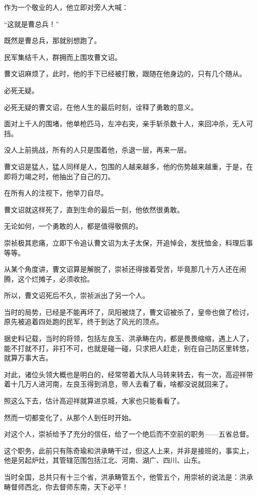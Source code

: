 \begin{multicols}{\theparacolNo}
		作为一个敬业的人，他立即对旁人大喊：

		“这就是曹总兵！”

		既然是曹总兵，那就别想跑了。

		民军集结千人，群拥而上围攻曹文诏。

		曹文诏麻烦了，此时，他的手下已经被打散，跟随在他身边的，只有几个随从。

		必死无疑。

		必死无疑的曹文诏，在他人生的最后时刻，诠释了勇敢的意义。

		面对上千人的围堵，他单枪匹马，左冲右突，亲手斩杀数十人，来回冲杀，无人可挡。

		没人上前挑战，所有的人只是围着他，杀退一层，再来一层。

		曹文诏是猛人，猛人同样是人，包围的人越来越多，他的伤势越来越重，于是，在即将力竭之时，他抽出了自己的刀。

		在所有人的注视下，他举刀自尽。

		曹文诏就这样死了，直到生命的最后一刻，他依然很勇敢。

		无论如何，一个勇敢的人，都是值得敬佩的。

		崇祯极其悲痛，立即下令追认曹文诏为太子太保，开追悼会，发抚恤金，料理后事等等。

		从某个角度讲，曹文诏算是解脱了，崇祯还得接着受苦，毕竟那几十万人还在闹腾，这个烂摊子，必须收拾。

		所以，曹文诏死后不久，崇祯派出了另一个人。

		当时的局势，已经是不能再坏了，凤阳被烧了，曹文诏被杀了，皇帝也做了检讨，原先被追着四处跑的民军，终于到达了风光的顶点。

		据史料记载，当时的将领，包括左良玉、洪承畴在内，都是畏畏缩缩，遇上人了，能不打就不打，非打不可，也就是碰一碰，只求把人赶走，别在自己防区里转悠，就算万事大吉。

		对此，诸位头领大概也是明白的，经常带着大队人马转来转去，有一次，高迎祥带着十几万人进河南，左良玉得到消息，带人去看了看，啥都没说就回来了。

		照这么下去，估计高迎祥就算进京城，大家也只能看看了。

		然而一切都变化了，从那个人到任时开始。

		对这个人，崇祯给予了充分的信任，给了一个绝后而不空前的职务——五省总督。

		这个职务，此前只有陈奇瑜和洪承畴干过，但这人上来，并非是接班的，事实上，他是另起炉灶，其管辖范围包括江北、河南、湖广、四川、山东。

		当时全国，总共只有十三个省，洪承畴管五个，他管五个，用崇祯的说法是：洪承畴督师西北，你去督师东南，天下必平！


\end{multicols}
